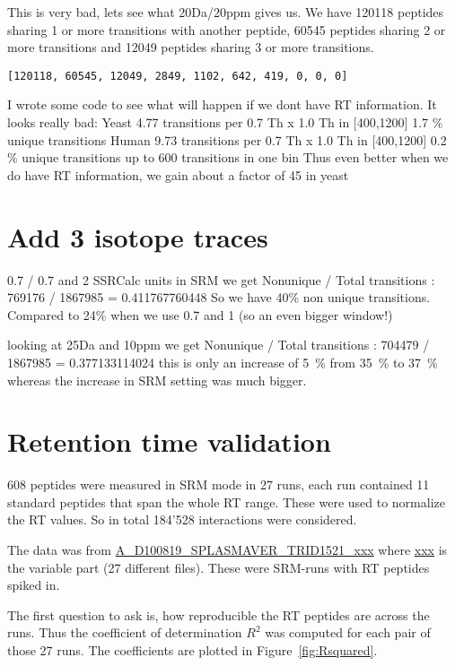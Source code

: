 This is very bad, lets see what 20Da/20ppm gives us. We have 120118 peptides
sharing 1 or more transitions with another peptide, 60545 peptides sharing 2 or
more transitions and 12049 peptides sharing 3 or more transitions.

\begin{verbatim}
[120118, 60545, 12049, 2849, 1102, 642, 419, 0, 0, 0]
\end{verbatim}


I wrote some code to see what will happen if we dont have RT information. It
looks really bad: 
Yeast
4.77 transitions per 0.7 Th x 1.0 Th in [400,1200]
1.7 \% unique transitions
Human
9.73 transitions per 0.7 Th x 1.0 Th in [400,1200]
0.2 \% unique transitions
up to 600 transitions in one bin 
\newline
Thus even better when we do have RT information, we gain about a factor of 45 in yeast

\section{Add 3 isotope traces}
0.7 / 0.7 and 2 SSRCalc units in SRM we get Nonunique / Total transitions : 769176 / 1867985 = 0.411767760448
So we have 40\% non unique transitions. Compared to 24\% when we use 0.7 and 1 (so an even bigger window!)

looking at 25Da and 10ppm we get Nonunique / Total transitions : 704479 / 1867985 = 0.377133114024
this is only an increase of 5~\% from 35~\% to 37~\% whereas the increase in SRM setting was much bigger.

\section{Retention time validation}

608 peptides were measured in SRM mode in 27 runs, each run contained 11
standard peptides that span the whole RT range. These were used to normalize
the RT values. So in total 184'528 interactions were considered.

The data was from  \url{A_D100819_SPLASMAVER_TRID1521_xxx} where \url{xxx} is
the variable part (27 different files). These were SRM-runs with RT peptides
spiked in.

The first question to ask is, how reproducible the RT peptides are across the
runs. Thus the coefficient of determination $R^2$ was computed for each pair of
those 27 runs. The coefficients are plotted in Figure~\ref{fig:Rsquared}.


